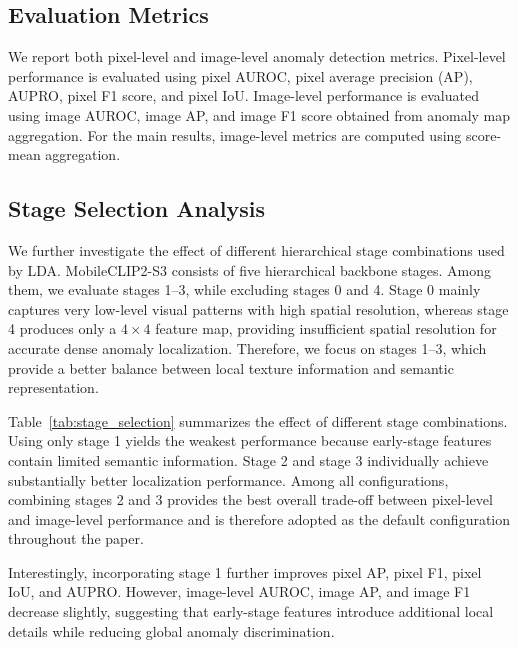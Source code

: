 \documentclass[10pt]{article}
\begin{document}
\subsection{Evaluation Metrics}

We report both pixel-level and image-level anomaly detection metrics. Pixel-level performance is evaluated using pixel AUROC, pixel average precision (AP), AUPRO, pixel F1 score, and pixel IoU. Image-level performance is evaluated using image AUROC, image AP, and image F1 score obtained from anomaly map aggregation. For the main results, image-level metrics are computed using score-mean aggregation.


\subsection{Stage Selection Analysis}

We further investigate the effect of different hierarchical stage combinations used by LDA.
MobileCLIP2-S3 consists of five hierarchical backbone stages.
Among them, we evaluate stages 1--3, while excluding stages 0 and 4.
Stage 0 mainly captures very low-level visual patterns with high spatial resolution, whereas stage 4 produces only a $4\times4$ feature map, providing insufficient spatial resolution for accurate dense anomaly localization.
Therefore, we focus on stages 1--3, which provide a better balance between local texture information and semantic representation.

Table~\ref{tab:stage_selection} summarizes the effect of different stage combinations.
Using only stage 1 yields the weakest performance because early-stage features contain limited semantic information.
Stage 2 and stage 3 individually achieve substantially better localization performance.
Among all configurations, combining stages 2 and 3 provides the best overall trade-off between pixel-level and image-level performance and is therefore adopted as the default configuration throughout the paper.

Interestingly, incorporating stage 1 further improves pixel AP, pixel F1, pixel IoU, and AUPRO.
However, image-level AUROC, image AP, and image F1 decrease slightly, suggesting that early-stage features introduce additional local details while reducing global anomaly discrimination.
\end{document}
